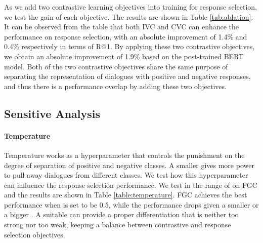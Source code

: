 \documentclass[letterpaper]{article} \usepackage{aaai22}  \usepackage{times}  \usepackage{helvet}  \usepackage{courier}  \usepackage[hyphens]{url}  \usepackage{graphicx} \urlstyle{rm} \def\UrlFont{\rm}  \usepackage{natbib}  \usepackage{caption} \DeclareCaptionStyle{ruled}{labelfont=normalfont,labelsep=colon,strut=off} \frenchspacing  \setlength{\pdfpagewidth}{8.5in}  \setlength{\pdfpageheight}{11in}  \usepackage{algorithm}
\begin{document}
\begin{table}[htbp]
\centering
{}
\caption{Ablation Analysis on the Ubuntu corpus.}
\label{tab:ablation}
\end{table}

As we add two contrastive learning objectives into training for response selection, we test the gain of each objective. The results are shown in Table \ref{tab:ablation}. It can be observed from the table that both IVC and CVC can enhance the performance on response selection, with an absolute improvement of 1.4\% and 0.4\% respectively in terms of R@1. By applying these two contrastive objectives, we obtain an absolute improvement of 1.9\% based on the post-trained BERT model. Both of the two contrastive objectives share the same purpose of separating the representation of dialogues with positive and negative responses, and thus there is a performance overlap by adding these two objectives. 

\subsection{Sensitive Analysis}

\paragraph{Temperature} Temperature  works as a hyperparameter that controls the punishment on the degree of separation of positive and negative classes. A smaller  gives more power to pull away dialogues from different classes. We test how this hyperparameter can influence the response selection performance. We test  in the range of  on FGC and the results are shown in Table \ref{table:temperature}. FGC achieves the best performance when  is set to be 0.5, while the performance drops given a smaller or a bigger . A suitable  can provide a proper differentiation that is neither too strong nor too weak, keeping a balance between contrastive and response selection objectives. 
\end{document}
